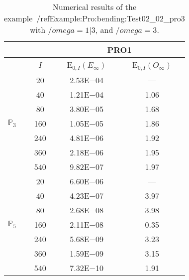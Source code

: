 \begin{table}[H]
\caption{Numerical results of the example~/ref{Example:Pro:bending:Test02_02_pro3} with $/omega=1|3$, and $/omega=3$.}
\setlength{\tabcolsep}{5pt}
\centering
\begin{tabular}{@{}l c c c@{}}
\toprule
 &  & \multicolumn{2}{c}{PRO1}\\
\midrule
 & $I$ & E$_{0,I}(E_{\infty})$ & E$_{0,I}(O_{\infty})$\\
\midrule
\multirow{7}{*}{$\mathbb{P}_{3}$}
 & 20 & 2.53E$-$04 & ---\\
 & 40 & 1.21E$-$04 & 1.06\\
 & 80 & 3.80E$-$05 & 1.68\\
 & 160 & 1.05E$-$05 & 1.86\\
 & 240 & 4.81E$-$06 & 1.92\\
 & 360 & 2.18E$-$06 & 1.95\\
 & 540 & 9.82E$-$07 & 1.97\\
\midrule
\multirow{7}{*}{$\mathbb{P}_{5}$}
 & 20 & 6.60E$-$06 & ---\\
 & 40 & 4.23E$-$07 & 3.97\\
 & 80 & 2.68E$-$08 & 3.98\\
 & 160 & 2.11E$-$08 & 0.35\\
 & 240 & 5.68E$-$09 & 3.23\\
 & 360 & 1.59E$-$09 & 3.15\\
 & 540 & 7.32E$-$10 & 1.91\\
\bottomrule
\end{tabular}
\label{Table:PRO:test_02_02_test7_pro3}
\end{table}
